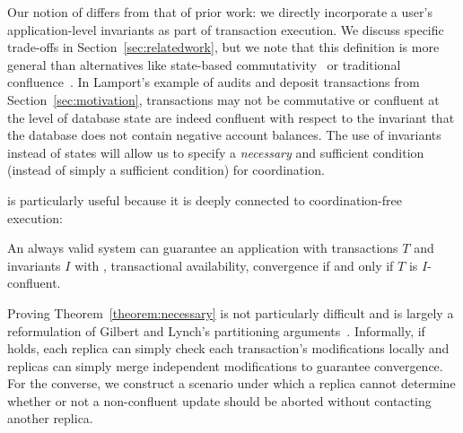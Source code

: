  Our notion of \iconfluence
differs from that of prior work: we directly incorporate a user's
application-level invariants as part of transaction execution. We
discuss specific trade-offs in Section~\ref{sec:relatedwork}, but we
note that this definition is more general than alternatives like
state-based commutativity~\cite{weihl-thesis} or traditional
confluence~\cite{calm,termrewriting}. In Lamport's example of audits
and deposit transactions from Section~\ref{sec:motivation},
transactions may not be commutative or confluent at the level of
database state are indeed confluent with respect to the invariant that
the database does not contain negative account balances. The use of
invariants instead of states will allow us to specify a
\textit{necessary} and sufficient condition (instead of simply a
sufficient condition) for coordination.

\iconfluence is particularly useful because it is deeply connected to
coordination-free execution:

\begin{theorem}
\label{theorem:necessary}
An always valid system can guarantee an application with transactions
$T$ and invariants $I$ with \cfreedom, transactional availability,
convergence if and only if $T$ is $I$-confluent.
\end{theorem}

Proving Theorem~\ref{theorem:necessary} is not particularly difficult
and is largely a reformulation of Gilbert and Lynch's partitioning
arguments~\cite{gilbert-cap}. Informally, if \iconfluence holds, each
replica can simply check each transaction's modifications locally and
replicas can simply merge independent modifications to guarantee
convergence. For the converse, we construct a scenario under which a
replica cannot determine whether or not a non-confluent update should
be aborted without contacting another replica.

